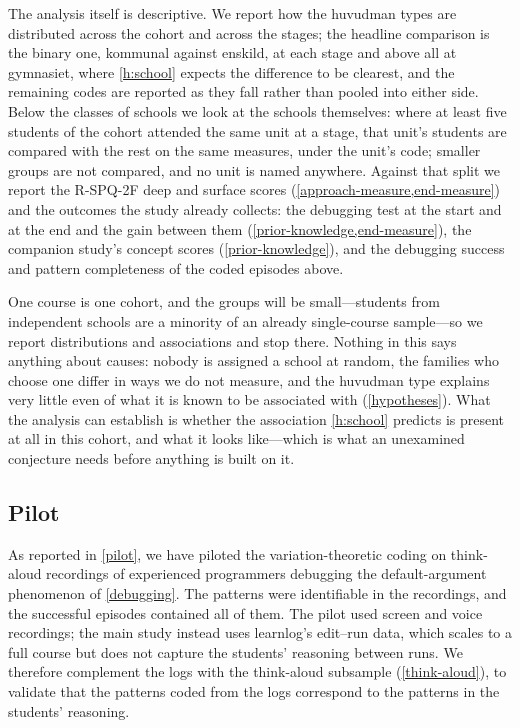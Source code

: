 The analysis itself is descriptive.
We report how the huvudman types are distributed across the cohort and
across the stages; the headline comparison is the binary one, kommunal
against enskild, at each stage and above all at gymnasiet, where
\cref{h:school} expects the difference to be clearest, and the remaining
codes are reported as they fall rather than pooled into either side.
Below the classes of schools we look at the schools themselves: where at
least five students of the cohort attended the same unit at a stage,
that unit's students are compared with the rest on the same measures,
under the unit's code; smaller groups are not compared, and no unit is
named anywhere.
Against that split we report the R-SPQ-2F deep and surface scores
(\cref{approach-measure,end-measure}) and the outcomes the study already
collects: the debugging test at the start and at the end and the gain
between them (\cref{prior-knowledge,end-measure}), the companion study's
concept scores (\cref{prior-knowledge}), and the debugging success and
pattern completeness of the coded episodes above.

One course is one cohort, and the groups will be small---students from
independent schools are a minority of an already single-course
sample---so we report distributions and associations and stop there.
Nothing in this says anything about causes: nobody is assigned a school at
random, the families who choose one differ in ways we do not measure, and
the huvudman type explains very little even of what it is known to be
associated with (\cref{hypotheses}).
What the analysis can establish is whether the association \cref{h:school}
predicts is present at all in this cohort, and what it looks like---which
is what an unexamined conjecture needs before anything is built on it.

\subsection{Pilot}
\label{method-pilot}

As reported in \cref{pilot}, we have piloted the variation-theoretic coding on
think-aloud recordings of experienced programmers debugging the
default-argument phenomenon of \cref{debugging}.
The patterns were identifiable in the recordings, and the successful episodes
contained all of them.
The pilot used screen and voice recordings; the main study instead uses
learnlog's edit--run data, which scales to a full course but does not capture
the students' reasoning between runs.
We therefore complement the logs with the think-aloud subsample
(\cref{think-aloud}), to validate that the patterns coded from the logs
correspond to the patterns in the students' reasoning.

